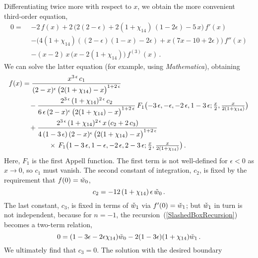 \documentclass[aps,prd,preprint,groupedaddress,nofootinbib,showpacs,eqsecnum]{revtex4}
\def\eps{\epsilon}
\begin{document}
Differentiating twice more with respect to $x$, we obtain the more
convenient third-order equation,
\begin{equation}
\begin{aligned}
0=\,\,&
-2\,f(x)
+2\,\bigl(2(2-\eps)+2(1+\chi_{14})\,(1-2\eps)-5\,x\bigr)\,f'(x)
\\ &
-\bigl( 4 (1+\chi_{14})( (2-\eps)(1-x) -2\eps)+x (7 x-10+2\eps)\bigr)\,f''(x)
\\&
-(x-2)\,x\,\bigl(x-2(1+\chi_{14})\bigr)\,f^{(3)}(x)
\,.
\end{aligned}
\end{equation}
We can solve the latter equation (for example, using \textsl{Mathematica\/}),
obtaining
\begin{equation}
\begin{aligned}
f(x) &= 
\frac{x^{3\,\eps}\,c_1}
{(2-x)^{\eps}\,\bigl(2(1+\chi_{14})-x\bigr)^{1+2\,\eps}}
\\&\hphantom{=}\,
-\frac{2^{3\,\eps}\,(1+\chi_{14})^{2\,\eps}
	\,c_2}
{6\,\eps\,(2-x)^{\eps}\,\bigl(2(1+\chi_{14})-x\bigr)^{1+2\,\eps}}
\,F_1\bigl(-3\,\eps,-\eps,-2\,\eps,1-3\,\eps;\tfrac{x}{2},
\tfrac{x}{2(1+\chi_{14})}\bigr)
\\&\hphantom{=}\,
+\frac{2^{3\,\eps}\,(1+\chi_{14})^{2\,\eps}\,x
	\,(c_2+2\,c_3)}{4\,(1-3\,\eps)\,(2-x)^{\eps}
	   \,\bigl(2(1+\chi_{14})-x\bigr)^{1+2\,\eps}}
\\&\hphantom{=}\,\hspace*{10mm}\times
   \,F_1\bigl(1-3\,\eps,1-\eps,-2\,\eps,2-3\,\eps;\tfrac{x}{2},
   \tfrac{x}{2(1+\chi_{14})}\bigr)
\,.
\end{aligned}
\end{equation}
Here, $F_1$ is the first Appell function.
The first term is not well-defined for $\eps<0$ as $x\rightarrow 0$, so
$c_1$ must vanish.  The second constant of integration, $c_2$, is fixed
by the requirement that $f(0) = \check{w}_0$, 
\begin{equation}
c_2 = -12\,(1+\chi_{14})\,\eps\,\ws_0\,.
\end{equation}
The last constant, $c_3$, is fixed in terms of $\check{w}_1$ via $f'(0) = \check{w}_1$; but
$\check{w}_1$ in turn is not independent, because for $n=-1$, 
the recursion~(\ref{SlashedBoxRecursion}) becomes a two-term relation,
\begin{equation}
0 = (1-3\eps-2\eps \chi_{14}) \ws_0 -2 (1-3\eps)(1+\chi_{14}) \ws_1\,.
\end{equation}
We ultimately find that $c_3=0$.  The solution with the desired boundary
\end{document}

